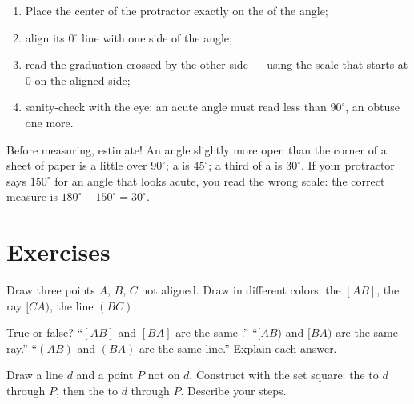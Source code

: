 \begin{method}\label{met:g6:lines:protractor}
\begin{enumerate}
  \item Place the center of the protractor exactly on the  of the
        angle;
  \item align its $0^\circ$ line with one side of the angle;
  \item read the graduation crossed by the other side --- using the
        scale that starts at $0$ on the aligned side;
  \item sanity-check with the eye: an acute angle must read less than
        $90^\circ$, an obtuse one more.
\end{enumerate}
\end{method}

\begin{example}\label{ex:g6:lines:estimate}
Before measuring, estimate! An angle slightly more open than the corner
of a sheet of paper is a little over $90^\circ$;  a  is
$45^\circ$; a third of a  is $30^\circ$. If your protractor
says $150^\circ$ for an angle that looks acute, you read the wrong
scale: the correct measure is $180^\circ - 150^\circ = 30^\circ$.
\end{example}

\section{Exercises}

\begin{exercise}[$\star$]\label{exo:g6:lines:1}
Draw three points $A$, $B$, $C$ not aligned. Draw in different colors:
the  $[AB]$, the ray $[CA)$, the line $(BC)$.
\end{exercise}

\begin{exercise}[$\star$]\label{exo:g6:lines:2}
True or false? ``$[AB]$ and $[BA]$ are the same .''
``$[AB)$ and $[BA)$ are the same ray.'' ``$(AB)$ and $(BA)$ are the
same line.'' Explain each answer.
\end{exercise}

\begin{exercise}[$\star$]\label{exo:g6:lines:3}
Draw a line $d$ and a point $P$ not on $d$. Construct with the set
square: the  to $d$ through $P$, then the  to $d$
through $P$. Describe your steps.
\end{exercise}

